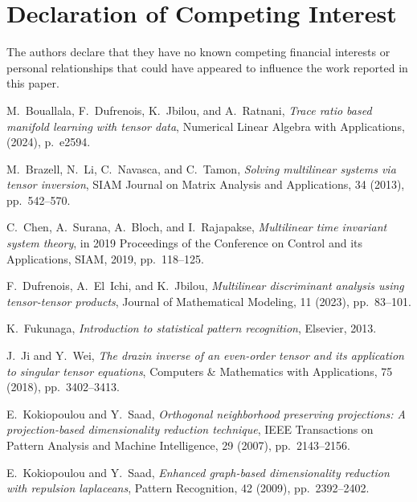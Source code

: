 \documentclass{siamltex}
\begin{document}
\section{Declaration of Competing Interest}
The authors declare that they have no known competing financial interests or personal relationships that could have appeared to influence the work reported in this paper.




\begin{thebibliography}{10}

{\sc M.~Bouallala, F.~Dufrenois, K.~Jbilou, and A.~Ratnani}, {\em Trace ratio
    based manifold learning with tensor data}, Numerical Linear Algebra with
    Applications,  (2024), p.~e2594.

{\sc M.~Brazell, N.~Li, C.~Navasca, and C.~Tamon}, {\em Solving multilinear
    systems via tensor inversion}, SIAM Journal on Matrix Analysis and
    Applications, 34 (2013), pp.~542--570.

{\sc C.~Chen, A.~Surana, A.~Bloch, and I.~Rajapakse}, {\em Multilinear time
    invariant system theory}, in 2019 Proceedings of the Conference on Control
    and its Applications, SIAM, 2019, pp.~118--125.

{\sc F.~Dufrenois, A.~El~Ichi, and K.~Jbilou}, {\em Multilinear discriminant
    analysis using tensor-tensor products}, Journal of Mathematical Modeling, 11
    (2023), pp.~83--101.

{\sc K.~Fukunaga}, {\em Introduction to statistical pattern recognition},
    Elsevier, 2013.

{\sc J.~Ji and Y.~Wei}, {\em The drazin inverse of an even-order tensor and its
    application to singular tensor equations}, Computers \& Mathematics with
    Applications, 75 (2018), pp.~3402--3413.

{\sc E.~Kokiopoulou and Y.~Saad}, {\em Orthogonal neighborhood preserving
    projections: A projection-based dimensionality reduction technique}, IEEE
    Transactions on Pattern Analysis and Machine Intelligence, 29 (2007),
    pp.~2143--2156.

{\sc E.~Kokiopoulou and Y.~Saad}, {\em Enhanced graph-based dimensionality
    reduction with repulsion laplaceans}, Pattern Recognition, 42 (2009),
    pp.~2392--2402.


\end{thebibliography}
\end{document}
